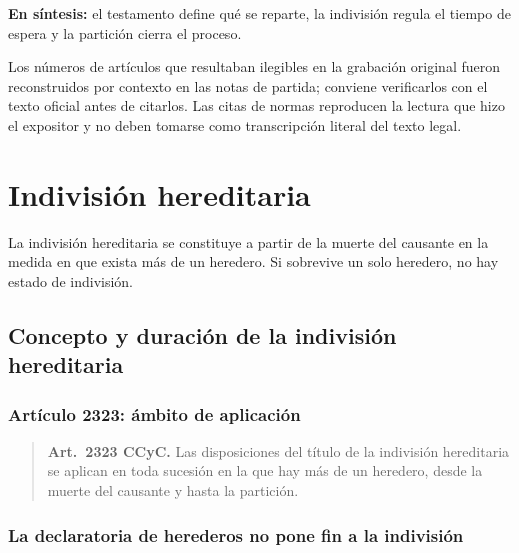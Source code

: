 \documentclass[12pt,oneside]{book}
\begin{document}
\textbf{En síntesis:} el testamento define qué se reparte, la indivisión regula el tiempo de espera y la partición cierra el proceso.

\begin{note}
Los números de artículos que resultaban ilegibles en la grabación original fueron reconstruidos por contexto en las notas de partida; conviene verificarlos con el texto oficial antes de citarlos. Las citas de normas reproducen la lectura que hizo el expositor y no deben tomarse como transcripción literal del texto legal.
\end{note}

\clearpage
{}
\chapter[Indivisión hereditaria]{Indivisión hereditaria}

La indivisión hereditaria se constituye a partir de la muerte del causante en la medida en que exista más de un heredero. Si sobrevive un solo heredero, no hay estado de indivisión.

\section{Concepto y duración de la indivisión hereditaria}

\subsection{Artículo 2323: ámbito de aplicación}

\begin{quote}
\textbf{Art.~2323 CCyC.} Las disposiciones del título de la indivisión hereditaria se aplican en toda sucesión en la que hay más de un heredero, desde la muerte del causante y hasta la partición.
\end{quote}

\subsection{La declaratoria de herederos no pone fin a la indivisión}
\end{document}
